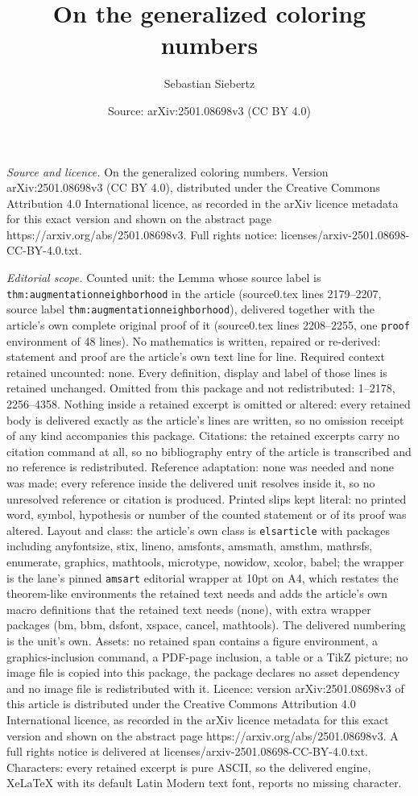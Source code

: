 \documentclass[10pt,a4paper]{amsart}
\title[On the generalized coloring numbers]{On the generalized coloring numbers}
\author{Sebastian Siebertz}
\date{Source: arXiv:2501.08698v3 (CC BY 4.0)}
\begin{document}
\maketitle

\noindent\emph{Source and licence.} On the generalized coloring numbers. Version arXiv:2501.08698v3 (CC BY 4.0), distributed under the Creative Commons Attribution 4.0 International licence, as recorded in the arXiv licence metadata for this exact version and shown on the abstract page https://arxiv.org/abs/2501.08698v3. Full rights notice: licenses/arxiv-2501.08698-CC-BY-4.0.txt.\par\smallskip

\noindent\textit{Editorial scope.} Counted unit: the Lemma whose source label is \texttt{thm:augmentationneighborhood} in the article (source0.tex lines 2179--2207, source label \texttt{thm:augmentationneighborhood}), delivered together with the article's own complete original proof of it (source0.tex lines 2208--2255, one \texttt{proof} environment of 48 lines). No mathematics is written, repaired or re-derived: statement and proof are the article's own text line for line. Required context retained uncounted: none. Every definition, display and label of those lines is retained unchanged. Omitted from this package and not redistributed: 1--2178, 2256--4358. Nothing inside a retained excerpt is omitted or altered: every retained body is delivered exactly as the article's lines are written, so no omission receipt of any kind accompanies this package. Citations: the retained excerpts carry no citation command at all, so no bibliography entry of the article is transcribed and no reference is redistributed. Reference adaptation: none was needed and none was made; every reference inside the delivered unit resolves inside it, so no unresolved reference or citation is produced. Printed slips kept literal: no printed word, symbol, hypothesis or number of the counted statement or of its proof was altered. Layout and class: the article's own class is \texttt{elsarticle} with packages including anyfontsize, stix, lineno, amsfonts, amsmath, amsthm, mathrsfs, enumerate, graphics, mathtools, microtype, nowidow, xcolor, babel; the wrapper is the lane's pinned \texttt{amsart} editorial wrapper at 10pt on A4, which restates the theorem-like environments the retained text needs and adds the article's own macro definitions that the retained text needs (none), with extra wrapper packages (bm, bbm, dsfont, xspace, cancel, mathtools). The delivered numbering is the unit's own. Assets: no retained span contains a figure environment, a graphics-inclusion command, a PDF-page inclusion, a table or a TikZ picture; no image file is copied into this package, the package declares no asset dependency and no image file is redistributed with it. Licence: version arXiv:2501.08698v3 of this article is distributed under the Creative Commons Attribution 4.0 International licence, as recorded in the arXiv licence metadata for this exact version and shown on the abstract page https://arxiv.org/abs/2501.08698v3. A full rights notice is delivered at licenses/arxiv-2501.08698-CC-BY-4.0.txt. Characters: every retained excerpt is pure ASCII, so the delivered engine, XeLaTeX with its default Latin Modern text font, reports no missing character.
\end{document}
